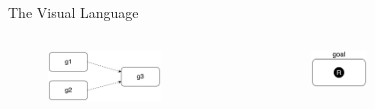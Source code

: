 \begin{frame}[allowframebreaks]{The Visual Language}
\begin{columns}
    \begin{column}{0.5\textwidth}
        \begin{figure}
            \centering
            \includegraphics[width=0.7\textwidth]{images/visual-language/dependency-or.png}
        \end{figure}
    \end{column}
    \begin{column}{0.5\textwidth}
        \begin{figure}
            \centering
            \includegraphics[width=0.35\textwidth]{images/visual-language/goal-allocation.png}
        \end{figure}
    \end{column}
\end{columns}

\end{frame}


